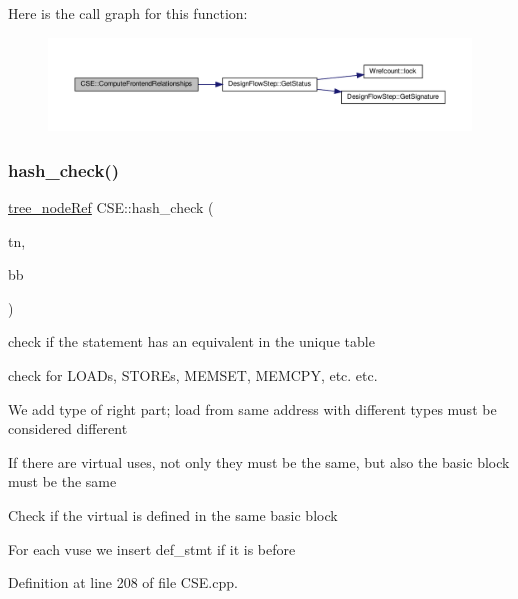 Here is the call graph for this function\+:
\nopagebreak
\begin{figure}[H]
\begin{center}
\leavevmode
\includegraphics[width=350pt]{d1/d73/classCSE_a0a111aeea50dcdf012272ad684136558_cgraph}
\end{center}
\end{figure}
\mbox{\label{classCSE_a0b52dafe140cbca69eadfa11169bfbba}} 
\subsubsection{\texorpdfstring{hash\+\_\+check()}{hash\_check()}}
{\footnotesize\ttfamily \hyperlink{tree__node_8hpp_a6ee377554d1c4871ad66a337eaa67fd5}{tree\+\_\+node\+Ref} C\+S\+E\+::hash\+\_\+check (\begin{DoxyParamCaption}\item[{\hyperlink{tree__node_8hpp_a6ee377554d1c4871ad66a337eaa67fd5}{tree\+\_\+node\+Ref}}]{tn,  }\item[{\hyperlink{graph_8hpp_abefdcf0544e601805af44eca032cca14}{vertex}}]{bb }\end{DoxyParamCaption})\hspace{0.3cm}{\ttfamily [private]}}



check if the statement has an equivalent in the unique table 

check for L\+O\+A\+Ds, S\+T\+O\+R\+Es, M\+E\+M\+S\+ET, M\+E\+M\+C\+PY, etc. etc.

We add type of right part; load from same address with different types must be considered different

If there are virtual uses, not only they must be the same, but also the basic block must be the same

Check if the virtual is defined in the same basic block

For each vuse we insert def\+\_\+stmt if it is before 

Definition at line 208 of file C\+S\+E.\+cpp.



